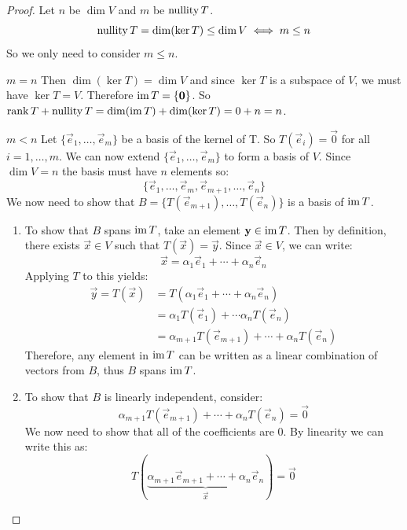 \documentclass[../main.tex]{subfiles}
\begin{document}
\begin{proof}
\nonexaminable
Let $n$ be $\dim V$ and $m$ be $\operatorname{nullity} T$.
\[
  \operatorname{nullity} T = \dim (\ker T) \leq \dim V \iff m \leq n
\]
So we only need to consider $m \leq n$.
\begin{proofcases}
  \begin{case}{$m = n$}
    Then $\dim(\ker T) = \dim V$ and since $\ker T$ is a subspace of $V$, we must have $\ker T = V$.
    Therefore $\operatorname{im} T = \{\mathbf{\bm{0}}\}$.
    So $\operatorname{rank} T + \operatorname{nullity} T = \dim(\operatorname{im} T) + \dim(\ker T) =0 + n = n$.
  \end{case}
  \begin{case}{$m < n$}
    Let $\{\vec{e}_1, \ldots, \vec{e}_m\}$ be a basis of the kernel of T.
    So $T(\vec{e}_i) = \vec{0}$ for all $i = 1, \ldots, m$.
    We can now extend $\{\vec{e}_1, \ldots, \vec{e}_m\}$ to form a basis of $V$.
    Since $\dim V = n$ the basis must have $n$ elements so:
    \[
      \{\vec{e}_1, \ldots, \vec{e}_m, \vec{e}_{m+1}, \ldots, \vec{e}_n\}
    \]
    We now need to show that $B = \{T(\vec{e}_{m + 1}), \ldots, T(\vec{e}_n)\}$ is a basis of $\operatorname{im} T$.
    \begin{enumerate}
      \item
      To show that $B$ spans $\operatorname{im} T$, take an element $\mathbf{\bm{y}} \in \operatorname{im} T$.
      Then by definition, there exists $\vec{x} \in V$ such that $T(\vec{x}) = \vec{y}$.
      Since $\vec{x} \in V$, we can write:
      \[
        \vec{x} = \alpha_1 \vec{e}_1 + \cdots + \alpha_n \vec{e}_n
      \]
      Applying $T$ to this yields:
      \begin{align*}
        \vec{y} = T(\vec{x}) &= T(\alpha_1 \vec{e}_1 + \cdots + \alpha_n \vec{e}_n) \\
                             &= \alpha_1 T(\vec{e}_1) + \cdots \alpha_n T(\vec{e}_n) \\
                             &= \alpha_{m + 1} T(\vec{e}_{m + 1}) + \cdots + \alpha_n T(\vec{e}_n)
      \end{align*}
      Therefore, any element in $\operatorname{im} T$ can be written as a linear combination of vectors from $B$, thus $B$ spans $\operatorname{im} T$.
      \item
      To show that $B$ is linearly independent, consider:
      \[
        \alpha_{m + 1} T(\vec{e}_{m+1}) + \cdots + \alpha_n T(\vec{e}_n) = \vec{0}
      \]
      We now need to show that all of the coefficients are 0.
      By linearity we can write this as:
      \[
        T(\underbrace{\alpha_{m + 1}\vec{e}_{m + 1} + \cdots + \alpha_n \vec{e}_n}_{\vec{x}}) = \vec{0}
      \]

\end{enumerate}
\end{case}
\end{proofcases}
\end{proof}
\end{document}
